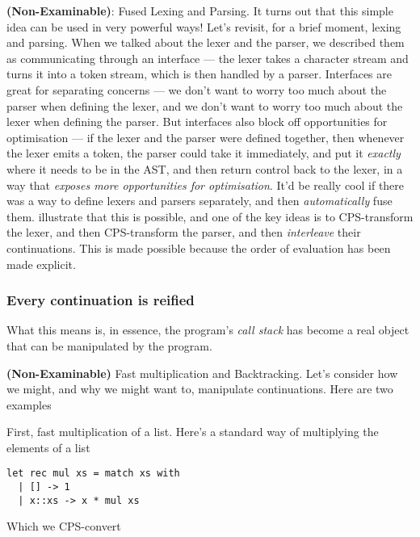 {\sffamily \textbf{(Non-Examinable)}: Fused Lexing and Parsing.} It turns out that this simple idea can be used in very powerful ways! Let's revisit, for a brief moment, lexing and parsing. When we talked about the lexer and the parser, we described them as communicating through an interface --- the lexer takes a character stream and turns it into a token stream, which is then handled by a parser. Interfaces are great for separating concerns --- we don't want to worry too much about the parser when defining the lexer, and we don't want to worry too much about the lexer when defining the parser. But interfaces also block off opportunities for optimisation --- if the lexer and the parser were defined together, then whenever the lexer emits a token, the parser could take it immediately, and put it \emph{exactly} where it needs to be in the AST, and then return control back to the lexer, in a way that \textit{exposes more opportunities for optimisation}. It'd be really cool if there was a way to define lexers and parsers separately, and then \emph{automatically} fuse them. \citet{yallop-2023} illustrate that this is possible, and one of the key ideas is to CPS-transform the lexer, and then CPS-transform the parser, and then \emph{interleave} their continuations. This is made possible because the order of evaluation has been made explicit. 

\subsubsection{Every continuation is reified}
What this means is, in essence, the program's \emph{call stack} has become a real object that can be manipulated by the program. 

{\sffamily \textbf{(Non-Examinable)} Fast multiplication and Backtracking}. Let's consider how we might, and why we might want to, manipulate continuations. Here are two examples

First, fast multiplication of a list. Here's a standard way of multiplying the elements of a list 

\begin{code}
\label{code:mul-ocaml}
\begin{verbatim}
let rec mul xs = match xs with
  | [] -> 1
  | x::xs -> x * mul xs
\end{verbatim}
\end{code}

Which we CPS-convert

